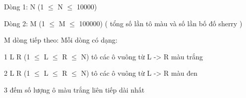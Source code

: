 Dòng 1: N (1  $\le$  N  $\le$  10000)  

   Dòng 2: M (1  $\le$  M  $\le$  100000) ( tổng số lần tô màu và số lần bố đố sherry )  

   M dòng tiếp theo: Mỗi dòng có dạng:  

   1  L  R  (1  $\le$  L  $\le$  R  $\le$  N) tô các ô vuông từ L -> R màu trắng  

   2  L  R  (1  $\le$  L  $\le$  R  $\le$  N) tô các ô vuông từ L -> R màu đen  

   3 đếm số lượng ô màu trắng liên tiếp dài nhất